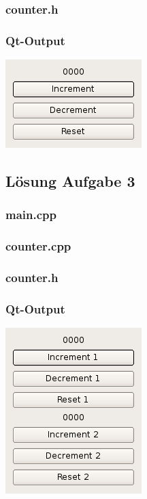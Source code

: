 \subsubsection{counter.h}

\subsubsection{Qt-Output}
\begin{center}
	\includegraphics[scale=.5]{./images/u12a2.png}
\end{center}

\subsection{Lösung Aufgabe 3}
\subsubsection{main.cpp}

\subsubsection{counter.cpp}

\subsubsection{counter.h}

\subsubsection{Qt-Output}
\begin{center}
	\includegraphics[scale=.5]{./images/u12a3.png}
\end{center}


